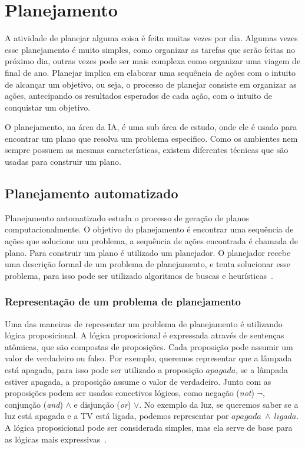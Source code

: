 \chapter{\label{chap:planejamento}Planejamento}

A atividade de planejar alguma coisa é feita muitas vezes por dia. Algumas vezes esse planejamento é muito simples, como organizar as tarefas que serão feitas no próximo dia, outras vezes pode ser mais complexa como organizar uma viagem de final de ano. Planejar implica em elaborar uma sequência de ações com o intuito de alcançar um objetivo, ou seja, o processo de planejar consiste em organizar as ações, antecipando os resultados esperados de cada ação, com o intuito de conquistar um objetivo. 

O planejamento, na área da IA, é uma sub área de estudo, onde ele é usado para encontrar um plano que resolva um problema especifico. Como os ambientes nem sempre possuem as mesmas características, existem diferentes técnicas que são usadas para construir um plano.

\section{Planejamento automatizado}

Planejamento automatizado estuda o processo de geração de planos computacionalmente. O objetivo do planejamento é encontrar uma sequência de ações que solucione um problema, a sequência de ações encontrada é chamada de plano. Para construir um plano é utilizado um planejador. O planejador recebe uma descrição formal de um problema de planejamento, e tenta solucionar esse problema, para isso pode ser utilizado algoritmos de buscas e heurísticas~\cite{ghallab2004automated}\cite[Capítulo 10]{intelligence2003modern}.

\subsection{Representação de um problema de planejamento}

Uma das maneiras de representar um problema de planejamento é utilizando lógica proposicional.
A lógica proposicional é expressada através de sentenças atômicas, que são compostas de proposições. 
Cada proposição pode assumir um valor de verdadeiro ou falso. 
Por exemplo, queremos representar que a lâmpada está apagada, para isso pode ser utilizado a proposição $apagada$, se a lâmpada estiver apagada, a proposição assume o valor de verdadeiro. Junto com as proposições podem ser usados conectivos lógicos, como negação (\textit{not}) $\neg$, conjunção (\textit{and}) $\wedge$ e disjunção (\textit{or}) $\vee$. 
No exemplo da luz, se queremos saber se a luz está apagada e a TV está ligada, podemos representar por $apagada~ \wedge~ ligada$. 
A lógica proposicional pode ser considerada simples, mas ela serve de base para as lógicas mais expressivas~\cite[Capítulo 10]{intelligence2003modern}. 

